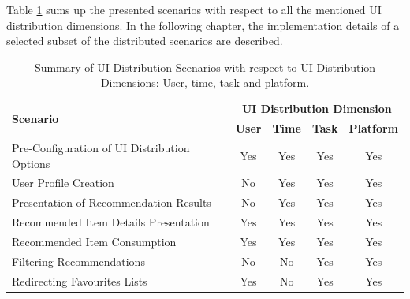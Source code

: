 Table \ref{tab:table31} sums up the presented scenarios with respect to all the
mentioned UI distribution dimensions. In the following chapter, the implementation details of a selected subset of the distributed scenarios are described.

\begin{table}[!htpb]
  \centering
  \begin{tabular}{ |l|c|c|c|c| }
  \hline
  \multirow{2}{*}{\textbf{Scenario}} &\multicolumn{4}{c|}{\textbf{UI Distribution Dimension}} \\
  \cline{2-5}
   & \textbf{User} & \textbf{Time} & \textbf{Task} & \textbf{Platform} \\
   \hline
   Pre-Configuration of UI Distribution Options & Yes & Yes & Yes & Yes \\
   \hline
   User Profile Creation & No & Yes & Yes & Yes \\
   \hline
   Presentation of Recommendation Results & No & Yes & Yes & Yes \\
   \hline
   Recommended Item Details Presentation & Yes & Yes & Yes & Yes \\
   \hline
   Recommended Item Consumption & Yes & Yes & Yes & Yes \\
   \hline
   Filtering Recommendations & No & No & Yes & Yes \\
   \hline
   Redirecting Favourites Lists & Yes & No & Yes & Yes \\
   \hline
   \end{tabular}
   \caption{Summary of UI Distribution Scenarios with respect to UI Distribution Dimensions: User, time, task and platform.}
   \label{tab:table31}  
\end{table}
  



